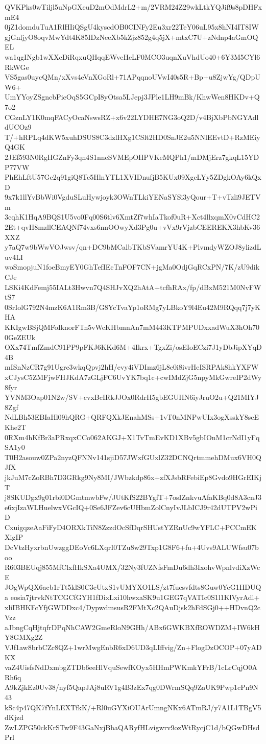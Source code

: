QVKPks0wTiljl5uNpGXeuD2mOdMdrL2+m/2VRM24Z29wkLtkYQJif9s8pDHFxmE4
0jZ1domduTuA1RlHIiQSgU4kyscdOB0CINFy2Eu3xr22TeY06uL95x8hNI4IT8IW
gjGnljyO8oqvMwYdt4K85IDzNeeXb5kZjz852g4q5jX+mtxC7U+zNdnp4aGmOQEL
wa1qgINgb1wXXcDiRqxuQHqqEWveHeLF0MCO3uqnXuVhdUo40+6Y3M5CYl6RkWGe
VS5gas0uycQMn/xXvs4eVnXGoRl+71APqqnoUVwI40s5R+Bp+u8ZjwYg/QDpUW6+
UmYYoyZSgncbPicOqS5GCpI8yOtsa5LJepj3JPle1LH9mBk/KhwWen8HKDv+Q7o2
CGznLY1K0mqFACyOcaNswsRZ+x6v22LYDHE7NG3oQ2D/v4BjXbPbNGYAdldUCOz9
T/+hRPLq4dKW5xuhDSUS8C3dzlHXg1CSlt2HD0SnJE2u5NNlEEvtD+RzMEiyQ4GK
2JEf593N0RgHGZnFy3qn4S1nneSVMEpOHPVKeMQPh1/mDMjErz7gkqL15YDP77VW
PhEhLftU57Ge2q91giQ8Tc5HlnYTL1XVIDnufjB5KUx09XgcLYy5ZDgkOAy6kQxD
9x7k1llYvBbWi0VgduSLuHywjoyk3OWnTLkiYENaSYSi3yQour+T+vTzli9JETVm
3cqhK1HqA9BQS1U5vo0Fq00S6tlv6XmtZf7whIaTkof0uR+Xct4llxqmX0vCdHC2
2Et+qvH8mzllCEAQNf74vxs6nnOOwyXd3Pg0u+vVx9rVjzbCEEREKX3hbKv36XXZ
y7aQ7w9bWwVOJwsv/qn+DC9bMCalbTKbSVamrYU4K+PlvmdyWZOJ8ylizdLuv4LI
woSmopjuN1foeBmyEY0GhTefIEcTnFOF7CN+jgMa0OdjGqRCxPN/7K/zU9dikCJe
LSKi4KdFemj55IALt3Hwvn7Q4SHJvXQ2hAtA+tcfhRAx/fp/dBxM521M0NvFWtS7
0SrIolG792N4mzK6A1Rm3B/G8YcTvaYp1oRMg7yLBkoY9l4Eu42M9RQqq7j7yKHA
KKIgwBSjQMFoIknorFTn5vWcKHbmnAn7mM443KTPMPUDxxadWuX3hOh700GeZEUk
OXx74TmfZmdC91PP9pFKJ6KKd6M+4Ikrx+TgxZi/osEIoECzi7J1yDbJipXYqD4B
mISnNzCR7g91Ugrc3wkqQpvj2hH/evy4iVDImz6jL8e0i8ivrHeISRPAk8hkYXFW
xCJysC5ZMFjwFHJKdA7zGLjFC6UvYK7bq1c+cwIMdZjG5npyMkGwreIP2dWy8fyr
YVNM3Oap01N2w/SV+cvxBcIRkJJOx0RdrH5gbEGUIIN6iyJruO2u+Q21MIYJ8Zgf
NdLBh53EBIaHl09hQRG+QRFQXkJEnahMSs+1vT0nMNPwUIx3ogXsskY8scEKhe2T
0RXm4hKfBr3aPRxqxCCo062AKGJ+X1TvTmEvKD1XBv5gbIOnM1crNdI1yFqSA1y0
T0H2asouw0ZPa2nyzQFNNv141sjiD57JWxfGUxlZ32DCNQrtmmehDMux6VH0QJfX
jkJuM7cZoRBh7D3GRkg9Ny8MI/JWbzkdp86x+zfXJsbRFebiEp8Gvdo9HGrEIKjT
j8SKUDgx9g01rbi0DGmtmwbFw/JUtKfS22BYgfT+7osIZnkvuAfaKBq0d8A3cnJ3
e6xjIzaWLHuelwxVGcIQ+0Se6JFZev6cUHbmZolCnyIvJLbICJ9r42dUTPV2wPiD
CxuigqzeAaFiFyD4ORXkTiN8ZzzdOcSfDqrSHUstYZRnUc9wYFLC+PCCmEKXigIP
DcVtzHyxrbnUwzggDEoVc6LXqrI0TZu8w29Txp1G8F6+fu+4Uvs9ALUWfsu07boo
R603BEUqj855MfClxfHkSXa4UMX/32Ny3fUZNfsFmDu6dh3IxohvWpnlvdiXzWcE
JOgWpQX6acb1rTt5klS0C3cUtxS1vUMYXO1LS/zt7fuesvfdts8Guw0YeG1HDUQa
eosia7jtrvkNtTCGCfGYH1fDixLxi10hwxaSK9u1GEG7qVATIc0S1l1KlVyrAdl+
xliIBHKFcYfjGWDDxc4/DypwdmsusR2FMtXc2QAuDjsk2hFdSGj0++HDvnQ2cVzz
aJbngCqHjtqfrDPqNhCAW2GmeRloN9GHh/ABx6GWKBXfROWDZM+IW6kHY8GMXg2Z
VJf1aw8brbCZr8QZ+1wrMwgEnbR6xD6UD3qLIffvig/Zn+FlogDzOCOP+07yADKX
vaZ4UisfsNdDxmbgZTDb6eeHlVquSewfKOyx5HHmPWKmkYFrB/1cLrCqjO0ARh6q
A9kZjkEz0Uv38/nyf5QapJAj8uRV1g4B3zEx7qg0DWrmSQq9ZaUK9Pwp1cPn9N43
kSc4p47QK7fYnLEXTfkK/+Rl0uGYXiOUArUmngNKx6ATmRJ/y7A1L1TBgV5dKjzd
ZwLZPG50ckKrSTw9F43GaNxjBbaQARyfHLvigwrv9ozWtRycjC1d/bQGwDHsdPrl
